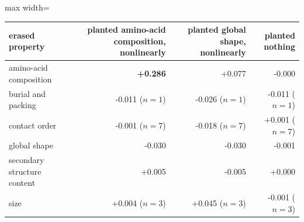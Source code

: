 \begin{adjustbox}{max width=\linewidth}
\begin{tabular}{lrrr}
\toprule
\rowcolor{CompassLavender!32}
erased property & planted amino-acid composition, nonlinearly & planted global shape, nonlinearly & planted nothing \\
\midrule
amino-acid composition & \textbf{+0.286} & +0.077 & -0.000 \\
burial and packing & -0.011 ($n=1$) & -0.026 ($n=1$) & -0.011 ($n=1$) \\
contact order & -0.001 ($n=7$) & -0.018 ($n=7$) & +0.001 ($n=7$) \\
global shape & -0.030 & -0.030 & -0.001 \\
secondary structure content & +0.005 & -0.005 & +0.000 \\
size & +0.004 ($n=3$) & +0.045 ($n=3$) & -0.001 ($n=3$) \\
\bottomrule
\end{tabular}
\end{adjustbox}
